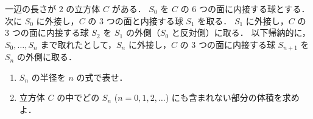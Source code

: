 \documentclass[a4paper,10pt]{ltjsarticle}
\begin{document}
\begin{oframed}
    一辺の長さが $2$ の立方体 $C$ がある．
    $S_0$ を $C$ の $6$ つの面に内接する球とする．
    次に $S_0$ に外接し，$C$ の $3$ つの面と内接する球 $S_1$ を取る．
    $S_1$ に外接し，$C$ の $3$ つの面に内接する球 $S_2$ を $S_1$ の外側（$S_0$ と反対側）に取る．
    以下帰納的に，$S_0, \ldots, S_n$ まで取れたとして，$S_n$ に外接し，$C$ の $3$ つの面に内接する球 $S_{n+1}$ を $S_n$ の外側に取る．
    \begin{enumerate}
        \item $S_n$ の半径を $n$ の式で表せ．
        \item 立方体 $C$ の中でどの $S_n$ ($n=0,1,2,\ldots$) にも含まれない部分の体積を求めよ．
    \end{enumerate}
\end{oframed}
\setlength{\columnseprule}{0.4pt}
\end{document}
